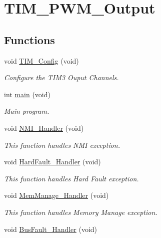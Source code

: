 \hypertarget{group___t_i_m___p_w_m___output}{\section{T\-I\-M\-\_\-\-P\-W\-M\-\_\-\-Output}
\label{group___t_i_m___p_w_m___output}
}
\subsection*{Functions}
\begin{DoxyCompactItemize}
\item 
void \hyperlink{group___t_i_m___p_w_m___output_ga54ca0fe4856d5d1a9e66faf7141c4d5b}{T\-I\-M\-\_\-\-Config} (void)
\begin{DoxyCompactList}\small\item\em Configure the T\-I\-M3 Ouput Channels. \end{DoxyCompactList}\item 
int \hyperlink{group___t_i_m___p_w_m___output_ga840291bc02cba5474a4cb46a9b9566fe}{main} (void)
\begin{DoxyCompactList}\small\item\em Main program. \end{DoxyCompactList}\item 
void \hyperlink{group___t_i_m___p_w_m___output_ga6ad7a5e3ee69cb6db6a6b9111ba898bc}{N\-M\-I\-\_\-\-Handler} (void)
\begin{DoxyCompactList}\small\item\em This function handles N\-M\-I exception. \end{DoxyCompactList}\item 
void \hyperlink{group___t_i_m___p_w_m___output_ga2bffc10d5bd4106753b7c30e86903bea}{Hard\-Fault\-\_\-\-Handler} (void)
\begin{DoxyCompactList}\small\item\em This function handles Hard Fault exception. \end{DoxyCompactList}\item 
void \hyperlink{group___t_i_m___p_w_m___output_ga3150f74512510287a942624aa9b44cc5}{Mem\-Manage\-\_\-\-Handler} (void)
\begin{DoxyCompactList}\small\item\em This function handles Memory Manage exception. \end{DoxyCompactList}\item 
void \hyperlink{group___t_i_m___p_w_m___output_ga850cefb17a977292ae5eb4cafa9976c3}{Bus\-Fault\-\_\-\-Handler} (void)

\end{DoxyCompactItemize}
